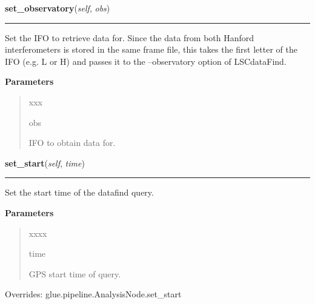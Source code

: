     \begin{boxedminipage}{\textwidth}

    \raggedright \textbf{set\_observatory}(\textit{self}, \textit{obs})

    \vspace{-1.5ex}

    \rule{\textwidth}{0.5\fboxrule}
    Set the IFO to retrieve data for. Since the data from both Hanford 
    interferometers is stored in the same frame file, this takes the 
    first letter of the IFO (e.g. L or H) and passes it to the 
    --observatory option of LSCdataFind.

    \vspace{1ex}

      \textbf{Parameters}
      \begin{quote}
        \begin{Ventry}{xxx}

          \item[obs]

          IFO to obtain data for.

        \end{Ventry}

      \end{quote}

    \vspace{1ex}

    \end{boxedminipage}

    \label{stochastic:LSCDataFindNode:set_start}
    \vspace{0.5ex}

    \begin{boxedminipage}{\textwidth}

    \raggedright \textbf{set\_start}(\textit{self}, \textit{time})

    \vspace{-1.5ex}

    \rule{\textwidth}{0.5\fboxrule}
    Set the start time of the datafind query.

    \vspace{1ex}

      \textbf{Parameters}
      \begin{quote}
        \begin{Ventry}{xxxx}

          \item[time]

          GPS start time of query.

        \end{Ventry}

      \end{quote}

    \vspace{1ex}

      Overrides: glue.pipeline.AnalysisNode.set\_start

    \end{boxedminipage}

